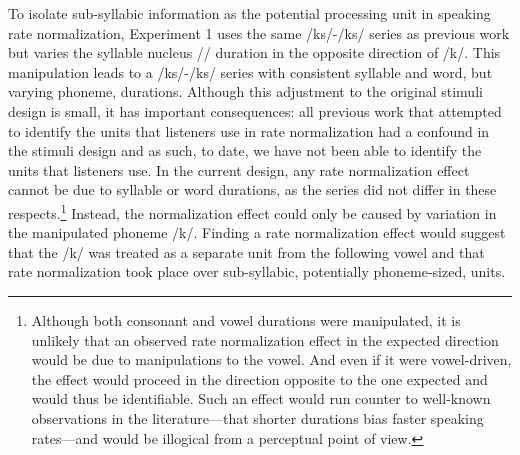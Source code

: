 \documentclass[preprint]{JASA}
\begin{document}
To isolate sub-syllabic information as the potential processing unit in speaking rate normalization, Experiment 1 uses the same /\textesh k\textscripta s/-/\textteshlig k\textscripta s/ series as previous work but varies the syllable nucleus /\textscripta/ duration in the opposite direction of /k/. This manipulation leads to a /\textesh k\textscripta s/-/\textteshlig k\textscripta s/ series with consistent syllable and word, but varying phoneme, durations. Although this adjustment to the original stimuli design is small, it has important consequences: all previous work that attempted to identify the units that listeners use in rate normalization had a confound in the stimuli design and as such, to date, we have not been able to identify the units that listeners use. In the current design, any rate normalization effect cannot be due to syllable or word durations, as the series did not differ in these respects.\footnote{Although both consonant and vowel durations were manipulated, it is unlikely that an observed rate normalization effect in the expected direction would be due to manipulations to the vowel. And even if it were vowel-driven, the effect would proceed in the direction opposite to the one expected and would thus be identifiable. Such an effect would run counter to well-known observations in the literature---that shorter durations bias faster speaking rates---and would be illogical from a perceptual point of view.} Instead, the normalization effect could only be caused by variation in the manipulated phoneme /k/. Finding a rate normalization effect would suggest that the /k/ was treated as a separate unit from the following vowel and that rate normalization took place over sub-syllabic, potentially phoneme-sized, units. 
\end{document}
